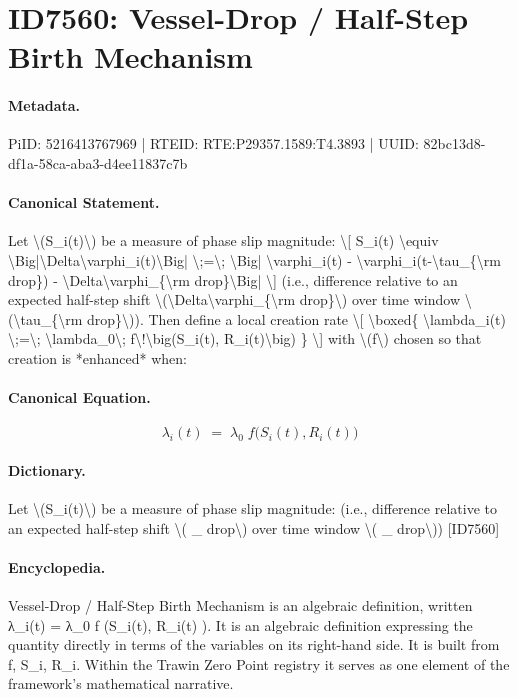 \section*{ID7560: Vessel-Drop / Half-Step Birth Mechanism}
\paragraph{Metadata.}
PiID: 5216413767969 | RTEID: RTE:P29357.1589:T4.3893 | UUID: 82bc13d8-df1a-58ca-aba3-d4ee11837c7b

\paragraph{Canonical Statement.}
Let \textbackslash{}(S\_i(t)\textbackslash{}) be a measure of phase slip magnitude: \textbackslash{}[ S\_i(t) \textbackslash{}equiv \textbackslash{}Big|\textbackslash{}Delta\textbackslash{}varphi\_i(t)\textbackslash{}Big| \textbackslash{};=\textbackslash{}; \textbackslash{}Big| \textbackslash{}varphi\_i(t) - \textbackslash{}varphi\_i(t-\textbackslash{}tau\_\{\textbackslash{}rm drop\}) - \textbackslash{}Delta\textbackslash{}varphi\_\{\textbackslash{}rm drop\}\textbackslash{}Big| \textbackslash{}] (i.e., difference relative to an expected half-step shift \textbackslash{}(\textbackslash{}Delta\textbackslash{}varphi\_\{\textbackslash{}rm drop\}\textbackslash{}) over time window \textbackslash{}(\textbackslash{}tau\_\{\textbackslash{}rm drop\}\textbackslash{})). Then define a local creation rate \textbackslash{}[ \textbackslash{}boxed\{ \textbackslash{}lambda\_i(t) \textbackslash{};=\textbackslash{}; \textbackslash{}lambda\_0\textbackslash{}; f\textbackslash{}!\textbackslash{}big(S\_i(t), R\_i(t)\textbackslash{}big) \} \textbackslash{}] with \textbackslash{}(f\textbackslash{}) chosen so that creation is *enhanced* when:

\paragraph{Canonical Equation.}
\[
\boxed{ \lambda_i(t) \;=\; \lambda_0\; f\!\big(S_i(t), R_i(t)\big) }
\]

\paragraph{Dictionary.}
Let \textbackslash{}(S\_i(t)\textbackslash{}) be a measure of phase slip magnitude: (i.e., difference relative to an expected half-step shift \textbackslash{}( \_ drop\textbackslash{}) over time window \textbackslash{}( \_ drop\textbackslash{})) [ID7560]

\paragraph{Encyclopedia.}
Vessel-Drop / Half-Step Birth Mechanism is an algebraic definition, written λ\_i(t) = λ\_0 f (S\_i(t), R\_i(t) ). It is an algebraic definition expressing the quantity directly in terms of the variables on its right-hand side. It is built from f, S\_i, R\_i. Within the Trawin Zero Point registry it serves as one element of the framework's mathematical narrative.
